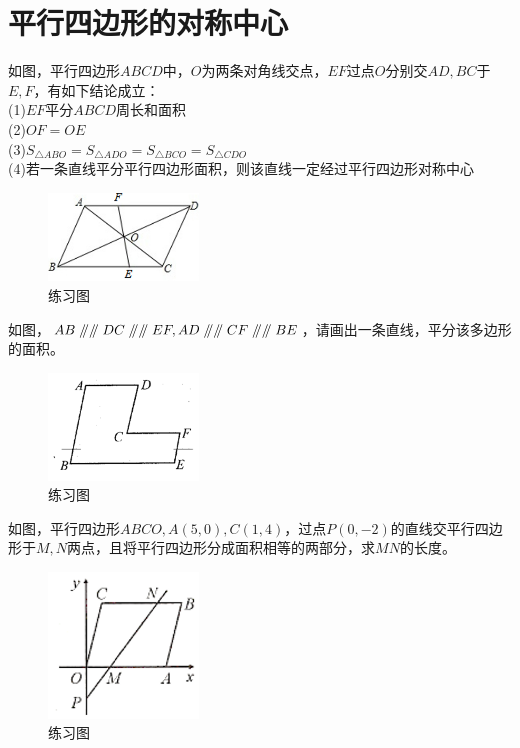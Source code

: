 \documentclass{ecnuthesis}
\newcommand\px{\mathrel{/\mkern-5mu/}}  %
\begin{document}
\section{平行四边形的对称中心}
\begin{model}
    如图，平行四边形$ABCD$中，$O$为两条对角线交点，$EF$过点$O$分别交$AD,BC$于$E,F$，有如下结论成立：\\
    (1)$EF$平分$ABCD$周长和面积 \\
    (2)$OF=OE$ \\
    (3)$S_{\triangle ABO}=S_{\triangle ADO}=S_{\triangle BCO}=S_{\triangle CDO}$ \\
    (4)若一条直线平分平行四边形面积，则该直线一定经过平行四边形对称中心
\end{model}
\begin{figure}[H]
\centering
\includegraphics[width=4cm]{picture/668.png}
\caption{练习图}
\end{figure}
\begin{problem}
    如图，$AB\px\px DC \px\px EF,AD\px\px CF\px\px BE$，请画出一条直线，平分该多边形的面积。
\end{problem}
\begin{figure}[H]
\centering
\includegraphics[width=4cm]{picture/6_2_3.png}
\caption{练习图}
\end{figure}
\begin{problem}
    如图，平行四边形$ABCO,A(5,0),C(1,4)$，过点$P(0,-2)$的直线交平行四边形于$M,N$两点，且将平行四边形分成面积相等的两部分，求$MN$的长度。
\end{problem}
\begin{figure}[H]
\centering
\includegraphics[width=4cm]{picture/669.png}
\caption{练习图}
\end{figure}
\clearpage
\end{document}
